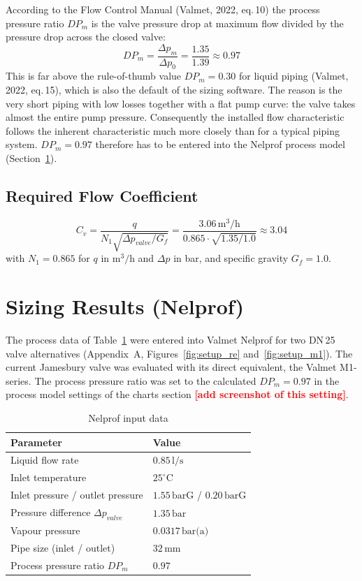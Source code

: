\documentclass[11pt,a4paper]{article}
\newcommand{\nel}[1]{\textcolor{red}{\textbf{[#1]}}}
\begin{document}
According to the Flow Control Manual (Valmet, 2022, eq.\,10) the process pressure ratio $DP_m$ is the valve pressure drop at maximum flow divided by the pressure drop across the closed valve:
\begin{equation}
    DP_m = \frac{\Delta p_m}{\Delta p_0} = \frac{1.35}{1.39} \approx 0.97
\end{equation}
This is far above the rule-of-thumb value $DP_m = 0.30$ for liquid piping (Valmet, 2022, eq.\,15), which is also the default of the sizing software. The reason is the very short piping with low losses together with a flat pump curve: the valve takes almost the entire pump pressure. Consequently the installed flow characteristic follows the inherent characteristic much more closely than for a typical piping system. $DP_m = 0.97$ therefore has to be entered into the Nelprof process model (Section~\ref{sec:nelprof}).

\subsection{Required Flow Coefficient}
\begin{equation}
    C_v = \frac{q}{N_1\sqrt{\Delta p_{valve}/G_f}} = \frac{3.06\,\text{m}^3/\text{h}}{0.865\cdot\sqrt{1.35/1.0}} \approx 3.04
\end{equation}
with $N_1 = 0.865$ for $q$ in $\text{m}^3/\text{h}$ and $\Delta p$ in bar, and specific gravity $G_f = 1.0$.

\section{Sizing Results (Nelprof)}
\label{sec:nelprof}
The process data of Table~\ref{tab:nelprof_in} were entered into Valmet Nelprof for two DN\,25 valve alternatives (Appendix~A, Figures~\ref{fig:setup_re} and~\ref{fig:setup_m1}). The current Jamesbury valve was evaluated with its direct equivalent, the Valmet M1-series. The process pressure ratio was set to the calculated $DP_m = 0.97$ in the process model settings of the charts section \nel{add screenshot of this setting}.

\begin{table}[H]
\centering
\caption{Nelprof input data}
\label{tab:nelprof_in}
\small
\begin{tabular}{@{}ll@{}}
\toprule
Parameter & Value \\
\midrule
Liquid flow rate & $0.85\,\text{l/s}$ \\
Inlet temperature & $25^\circ\text{C}$ \\
Inlet pressure / outlet pressure & $1.55\,\text{barG}$ / $0.20\,\text{barG}$ \\
Pressure difference $\Delta p_{valve}$ & $1.35\,\text{bar}$ \\
Vapour pressure & $0.0317\,\text{bar(a)}$ \\
Pipe size (inlet / outlet) & $32\,\text{mm}$ \\
Process pressure ratio $DP_m$ & $0.97$ \\
\bottomrule
\end{tabular}
\end{table}
\end{document}
